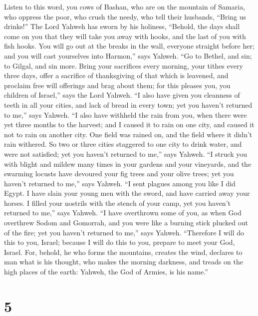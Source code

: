  Listen to this word, you cows of Bashan, who are on the
mountain of Samaria, who oppress the poor, who crush the needy, who tell
their husbands, ``Bring us drinks!''  The Lord Yahweh has
sworn by his holiness, ``Behold, the days shall come on you that they
will take you away with hooks, and the last of you with fish hooks.
 You will go out at the breaks in the wall, everyone
straight before her; and you will cast yourselves into Harmon,'' says
Yahweh.  ``Go to Bethel, and sin; to Gilgal, and sin more.
Bring your sacrifices every morning, your tithes every three days,
 offer a sacrifice of thanksgiving of that which is
leavened, and proclaim free will offerings and brag about them; for this
pleases you, you children of Israel,'' says the Lord Yahweh.
 ``I also have given you cleanness of teeth in all your
cities, and lack of bread in every town; yet you haven't returned to
me,'' says Yahweh.  ``I also have withheld the rain from
you, when there were yet three months to the harvest; and I caused it to
rain on one city, and caused it not to rain on another city. One field
was rained on, and the field where it didn't rain withered.
 So two or three cities staggered to one city to drink
water, and were not satisfied; yet you haven't returned to me,'' says
Yahweh.  ``I struck you with blight and mildew many times
in your gardens and your vineyards, and the swarming locusts have
devoured your fig trees and your olive trees; yet you haven't returned
to me,'' says Yahweh.  ``I sent plagues among you like I
did Egypt. I have slain your young men with the sword, and have carried
away your horses. I filled your nostrils with the stench of your camp,
yet you haven't returned to me,'' says Yahweh.  ``I have
overthrown some of you, as when God overthrew Sodom and Gomorrah, and
you were like a burning stick plucked out of the fire; yet you haven't
returned to me,'' says Yahweh.  ``Therefore I will do
this to you, Israel; because I will do this to you, prepare to meet your
God, Israel.  For, behold, he who forms the mountains,
creates the wind, declares to man what is his thought, who makes the
morning darkness, and treads on the high places of the earth: Yahweh,
the God of Armies, is his name.''

\hypertarget{section-4}{%
\section{5}\label{section-4}}

